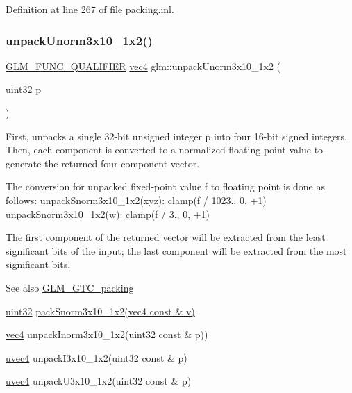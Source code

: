 Definition at line 267 of file packing.\+inl.

\mbox{\label{group__gtc__packing_gaf69ace2b5e9234f8afb4e99c3df1193d}} 
\subsubsection{\texorpdfstring{unpack\+Unorm3x10\+\_\+1x2()}{unpackUnorm3x10\_1x2()}}
{\footnotesize\ttfamily \hyperlink{setup_8hpp_a33fdea6f91c5f834105f7415e2a64407}{G\+L\+M\+\_\+\+F\+U\+N\+C\+\_\+\+Q\+U\+A\+L\+I\+F\+I\+ER} \hyperlink{group__core__types_ga5881b1b022d7fd1b7218f5916532dd02}{vec4} glm\+::unpack\+Unorm3x10\+\_\+1x2 (\begin{DoxyParamCaption}\item[{\hyperlink{group__gtc__type__precision_ga202b6a53c105fcb7e531f9b443518451}{uint32}}]{p }\end{DoxyParamCaption})}

First, unpacks a single 32-\/bit unsigned integer p into four 16-\/bit signed integers. Then, each component is converted to a normalized floating-\/point value to generate the returned four-\/component vector.

The conversion for unpacked fixed-\/point value f to floating point is done as follows\+: unpack\+Snorm3x10\+\_\+1x2(xyz)\+: clamp(f / 1023., 0, +1) unpack\+Snorm3x10\+\_\+1x2(w)\+: clamp(f / 3., 0, +1)

The first component of the returned vector will be extracted from the least significant bits of the input; the last component will be extracted from the most significant bits.

\begin{DoxySeeAlso}{See also}
\hyperlink{group__gtc__packing}{G\+L\+M\+\_\+\+G\+T\+C\+\_\+packing} 

\hyperlink{group__gtc__type__precision_ga202b6a53c105fcb7e531f9b443518451}{uint32} \hyperlink{group__gtc__packing_ga0d4157cec37c0312216a7be1cc92df54}{pack\+Snorm3x10\+\_\+1x2(vec4 const \& v)} 

\hyperlink{group__core__types_ga5881b1b022d7fd1b7218f5916532dd02}{vec4} unpack\+Inorm3x10\+\_\+1x2(uint32 const \& p)) 

\hyperlink{group__core__types_ga1c426d19627b32b14f0089f7f4ba7b1d}{uvec4} unpack\+I3x10\+\_\+1x2(uint32 const \& p) 

\hyperlink{group__core__types_ga1c426d19627b32b14f0089f7f4ba7b1d}{uvec4} unpack\+U3x10\+\_\+1x2(uint32 const \& p) 
\end{DoxySeeAlso}


